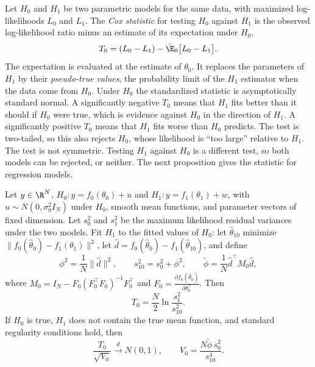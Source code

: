 Let $H_0$ and $H_1$ be two parametric models for the same data, with maximized log-likelihoods $L_0$ and $L_1$. The
\emph{Cox statistic} for testing $H_0$ against $H_1$ is the observed log-likelihood ratio minus an estimate of its
expectation under $H_0$,
\begin{equation}\label{eq:06-bres-coxstat}
  T_0 = (L_0 - L_1) - \hat\E_0\bigl[L_0 - L_1\bigr].
\end{equation}
The expectation is evaluated at the estimate of $\theta_0$. It replaces the parameters of $H_1$ by their
\emph{pseudo-true values}, the probability limit of the $H_1$ estimator when the data come from $H_0$. Under $H_0$ the
standardized statistic is asymptotically standard normal. A significantly negative $T_0$ means that $H_1$ fits better
than it should if $H_0$ were true, which is evidence against $H_0$ in the direction of $H_1$. A significantly positive
$T_0$ means that $H_1$ fits worse than $H_0$ predicts. The test is two-tailed, so this also rejects $H_0$, whose
likelihood is ``too large'' relative to $H_1$. The test is not symmetric. Testing $H_1$ against $H_0$ is a different
test, so both models can be rejected, or neither. The next proposition gives the statistic for regression models.

\begin{proposition}\label{prop:06-bres-cox}
Let $y \in \R^N$, $H_0: y = f_0(\theta_0) + u$ and $H_1: y = f_1(\theta_1) + w$, with $u \sim N(0,\sigma_0^2 I_N)$ under
$H_0$, smooth mean functions, and parameter vectors of fixed dimension. Let $s_0^2$ and $s_1^2$ be the maximum
likelihood residual variances under the two models. Fit $H_1$ to the fitted values of $H_0$: let
$\hat\theta_{10}$ minimize $\|f_0(\hat\theta_0) - f_1(\theta_1)\|^2$, let $\hat d = f_0(\hat\theta_0) - f_1(\hat\theta_{10})$,
and define
\begin{equation*}
  \phi^2 = \frac{1}{N}\|\hat d\|^2,
  \qquad s_{10}^2 = s_0^2 + \phi^2,
  \qquad \tilde\phi = \frac{1}{N}\hat d^\top M_0\hat d,
\end{equation*}
where $M_0 = I_N - F_0(F_0^\top F_0)^{-1}F_0^\top$ and $F_0 = \frac{\partial f_0(\hat\theta_0)}{\partial\theta_0^\top}$. Then
\begin{equation*}
  T_0 = \frac{N}{2}\ln\frac{s_1^2}{s_{10}^2}.
\end{equation*}
If $H_0$ is true, $H_1$ does not contain the true mean function, and standard regularity conditions hold, then
\begin{equation*}
  \frac{T_0}{\sqrt{V_0}} \xrightarrow{d} N(0,1),
  \qquad
  V_0 = \frac{N\tilde\phi\, s_0^2}{s_{10}^4}.
\end{equation*}
\end{proposition}

